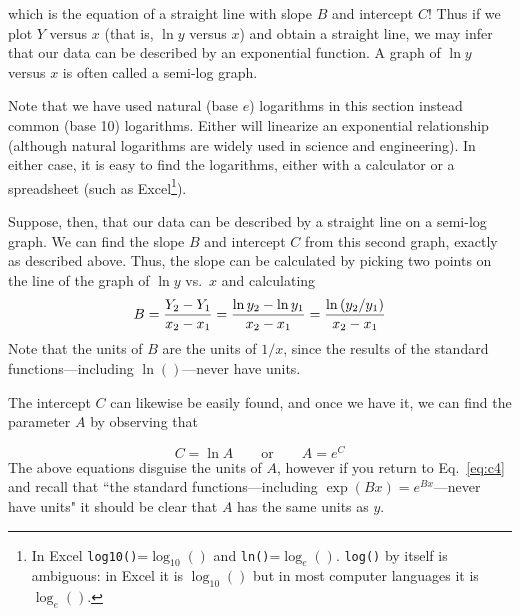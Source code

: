 which is the equation of a straight line with slope $B$ and
intercept $C$!  Thus if we plot $Y$ versus $x$ (that is,
$\ln y$ versus $x$) and obtain a straight line, we may infer that our
data can be described by an exponential function.  A graph of
$\ln y$ versus $x$ is often called a semi-log graph.

Note that we have used natural (base $e$) logarithms in this section
instead common (base 10) logarithms.  Either will linearize an exponential
relationship
(although natural logarithms are widely used in science and engineering).
  In either case,
it is easy to find the logarithms, either with a calculator or a
spreadsheet (such as Excel\footnote{
In Excel {\tt log10()}=$\log_{10}()$ and {\tt ln()}=$\log_e()$.
 {\tt log()} by itself is ambiguous: in Excel it is $\log_{10}()$
but in most computer languages it is $\log_e()$.}).

Suppose, then, that our data can be described by a straight line
on a semi-log graph.  We can find the slope $B$ and intercept $C$
from this second graph, exactly as described above.
Thus, the slope can be calculated by picking two points
on the line of the graph of $\ln y$ vs.\ $x$ and calculating
\begin{equation}
B = {{Y_{2} - Y_{1}} \over {x_{2} - x_{1}}} = {{\ln y_{2} - \ln y_{1}}
           \over {x_{2} - x_{1}}} = 
{\ln\left(y_{2}/y_{1}\right) \over x_{2} - x_{1}}  \label{eq:cnew}
\end{equation}
Note that the units of $B$ are the units of $1/x$, since the results of the 
standard functions---including $\ln()$---never have units. 

The intercept $C$ can likewise be easily found, and once we have it,
we can find the parameter $A$ by observing that

%
\begin{equation}
C = \ln A  \qquad \mbox{or} \qquad  A = e^{C} \label{eq:transformC}
\end{equation}
The above equations disguise the units of $A$, however if you return to Eq.~\ref{eq:c4}
and recall that ``the 
standard functions---including $\exp(Bx)=e^{Bx}$---never have units"
it should be clear that $A$ has the same units as $y$.

